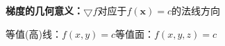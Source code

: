 {\bf 梯度的几何意义：}$\bigtriangledown f$对应于$f(\bm{x})=c$的法线方向
\begin{center}
	\hspace{3cm}
	
	等值(高)线：$f(x,y)=c$\hspace{3cm}等值面：$f(x,y,z)=c$
\end{center}

